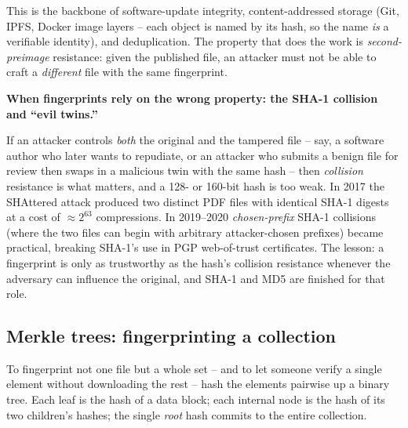 This is the backbone of software-update integrity, content-addressed storage (Git, IPFS, Docker image layers -- each object is named by its hash, so the name \emph{is} a verifiable identity), and deduplication. The property that does the work is \emph{second-preimage} resistance: given the published file, an attacker must not be able to craft a \emph{different} file with the same fingerprint.

\begin{attackbox}
\textbf{When fingerprints rely on the wrong property: the SHA-1 collision and ``evil twins.''}

If an attacker controls \emph{both} the original and the tampered file -- say, a software author who later wants to repudiate, or an attacker who submits a benign file for review then swaps in a malicious twin with the same hash -- then \emph{collision} resistance is what matters, and a 128- or 160-bit hash is too weak. In 2017 the SHAttered attack produced two distinct PDF files with identical SHA-1 digests at a cost of $\approx 2^{63}$ compressions. In 2019--2020 \emph{chosen-prefix} SHA-1 collisions (where the two files can begin with arbitrary attacker-chosen prefixes) became practical, breaking SHA-1's use in PGP web-of-trust certificates. The lesson: a fingerprint is only as trustworthy as the hash's collision resistance whenever the adversary can influence the original, and SHA-1 and MD5 are finished for that role.
\end{attackbox}

\subsection{Merkle trees: fingerprinting a collection}

To fingerprint not one file but a whole set -- and to let someone verify a single element without downloading the rest -- hash the elements pairwise up a binary tree. Each leaf is the hash of a data block; each internal node is the hash of its two children's hashes; the single \emph{root} hash commits to the entire collection.

\begin{center}
\end{center}

